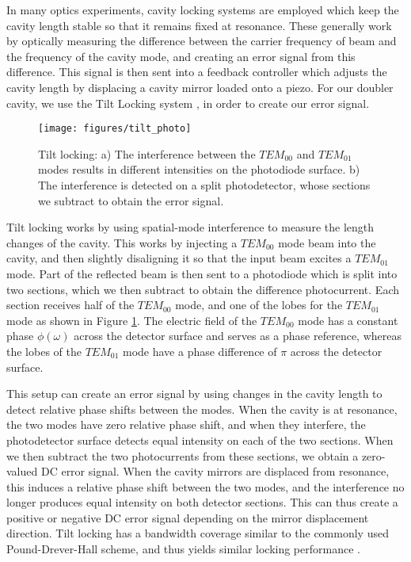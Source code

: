 In many optics experiments, cavity locking systems are employed which keep the cavity length stable so that it remains fixed at resonance.  These generally work by optically measuring the difference between the carrier frequency of beam and the frequency of the cavity mode, and creating an error signal from this difference.  This signal is then sent into a feedback controller which adjusts the cavity length by displacing a cavity mirror loaded onto a piezo.  For our doubler cavity, we use the Tilt Locking system \cite{Shaddock:99}, \cite{shaddock2001} in order to create our error signal.

\begin{figure}[!htb] 
 \centering 
 \texttt{[image: figures/tilt\_photo]} 
 \caption[Tilt locking schematic]{Tilt locking: a) The interference between
the $TEM_{00}$ and $TEM_{01}$ modes results in different intensities on the photodiode surface.   b)  The interference is detected on a split photodetector, whose sections we subtract to obtain the error signal.}
 \label{fig:tilt_ill} 
\end{figure}

Tilt locking works by using spatial-mode interference to measure the length
changes of the cavity.  This works by injecting a $TEM_{00}$ mode beam into
the cavity, and then slightly disaligning it so that the input beam excites a
$TEM_{01}$ mode.  Part of the reflected beam is then sent to a photodiode
which is split into two sections, which we then subtract to obtain the
difference photocurrent.  Each section receives half of the $TEM_{00}$ mode,
and one of the lobes for the $TEM_{01}$ mode as shown in Figure
\ref{fig:tilt_ill}.  The electric field of the $TEM_{00}$ mode has a constant
phase $\phi(\omega )$ across the detector surface and serves as a phase
reference, whereas the lobes of the $TEM_{01}$ mode have a phase difference of $\pi$ across the detector surface.  



This setup can create an error signal by using changes in the cavity length to detect relative phase shifts between the modes.  When the cavity is at resonance, the two modes have zero relative phase shift, and when they interfere, the photodetector surface detects equal intensity on each of the two sections.  When we then subtract the two photocurrents from these sections, we obtain a zero-valued DC error signal.  When the cavity mirrors are displaced from resonance, this induces a relative phase shift between the two modes, and the interference no longer produces equal intensity on both detector sections.  This can thus create a positive or negative DC error signal depending on the mirror displacement direction.  Tilt locking has a bandwidth coverage similar to the commonly used Pound-Drever-Hall scheme, and thus yields similar locking performance \cite{Shaddock:99}.

